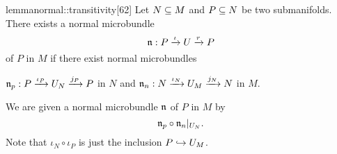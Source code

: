 \begin{mystatement}{lemma}{normal::transitivity}[62] Let $N \sub M$ and $P \sub N$ be two submanifolds. There exists a normal microbundle \[ \bundledef{\bn}{P}{U}{\iota}{r} \] of $P$ in $M$ if there exist normal microbundles \begin{center} $\bundledef{\bn_p}{P}{U_N}{\iota_P}{j_P}$ in $N$ and $\bundledef{\bn_n}{N}{U_M}{\iota_N}{j_N}$ in $M$. \end{center} \end{mystatement}

\begin{myproof} We are given a normal microbundle $\bn$ of $P$ in $M$ by \[ \bn_p \circ \bn_n\restr{U_N}. \] Note that $\iota_N \circ \iota_P$ is just the inclusion $P \incl U_M$. \end{myproof}